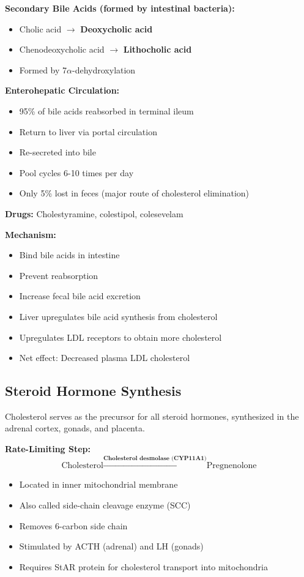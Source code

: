 \textbf{Secondary Bile Acids (formed by intestinal bacteria):}
\begin{itemize}
    \item Cholic acid $\rightarrow$ \textbf{Deoxycholic acid}
    \item Chenodeoxycholic acid $\rightarrow$ \textbf{Lithocholic acid}
    \item Formed by 7$\alpha$-dehydroxylation
\end{itemize}

\textbf{Enterohepatic Circulation:}
\begin{itemize}
    \item 95\% of bile acids reabsorbed in terminal ileum
    \item Return to liver via portal circulation
    \item Re-secreted into bile
    \item Pool cycles 6-10 times per day
    \item Only 5\% lost in feces (major route of cholesterol elimination)
\end{itemize}

\begin{tcolorbox}[colback=green!5, colframe=green!70!black, title=\textbf{Clinical Application: Bile Acid Sequestrants}]
\textbf{Drugs:} Cholestyramine, colestipol, colesevelam

\textbf{Mechanism:}
\begin{itemize}
    \item Bind bile acids in intestine
    \item Prevent reabsorption
    \item Increase fecal bile acid excretion
    \item Liver upregulates bile acid synthesis from cholesterol
    \item Upregulates LDL receptors to obtain more cholesterol
    \item Net effect: Decreased plasma LDL cholesterol
\end{itemize}
\end{tcolorbox}

\subsection{Steroid Hormone Synthesis}

Cholesterol serves as the precursor for all steroid hormones, synthesized in the adrenal cortex, gonads, and placenta.

\textbf{Rate-Limiting Step:}
\[
\text{Cholesterol} \xrightarrow{\textbf{Cholesterol desmolase (CYP11A1)}} \text{Pregnenolone}
\]
\begin{itemize}
    \item Located in inner mitochondrial membrane
    \item Also called side-chain cleavage enzyme (SCC)
    \item Removes 6-carbon side chain
    \item Stimulated by ACTH (adrenal) and LH (gonads)
    \item Requires StAR protein for cholesterol transport into mitochondria
\end{itemize}

